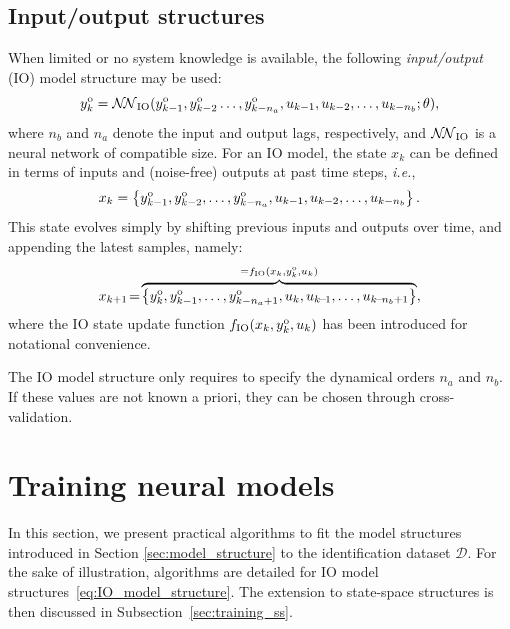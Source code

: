 \documentclass{article}
\newcommand{\NN}{\mathcal{N\!N}} %
\newcommand{\Did}{{\mathcal{D}}}
\newcommand{\ymodel}{y^{\rm o}}
\begin{document}
\subsection{Input/output structures}
When limited or no system knowledge is available, the following \emph{input/output} (IO) model structure may be used: 
\begin{equation}
\label{eq:IO_model_structure}
 \ymodel_{k} = \NN_{\rm IO}(\ymodel_{k-1}, \ymodel_{k-2}\dots, \ymodel_{k-n_a},
 u_{k-1},  u_{k-2}, \dots, u_{k-n_b}; \theta), 
\end{equation}
where $n_b$ and $n_a$ denote the input and output lags, respectively, and $\NN_{\rm IO}$ is a neural network of compatible size. For an IO model, the state $x_k$ can be defined in terms  of inputs and (noise-free) outputs at past time steps, \emph{i.e.}, 
\begin{equation}
\label{eq:IO_regressor_formula}
x_k = \left\{\ymodel_{k-1},  \ymodel_{k-2}, \dots, \ymodel_{k-n_a}, u_{k-1}, u_{k-2}, \dots, u_{k-n_b} \right\}.
\end{equation}
This state evolves simply by shifting previous inputs and outputs over time, and appending the latest samples, namely: 
\begin{equation}
\begin{split}
x_{k+1}\!=\!\overbrace{\left\{\ymodel_{k}, \ymodel_{k-1}, \dots, \ymodel_{k-n_a+1}, u_{k}, u_{k\!-\!1}, \dots, u_{k\!-\!n_b+1}\right\}}^{=f_{\rm IO}(x_k,\ymodel_k,u_k)},
\end{split}
\end{equation}
where the IO state update function $f_{\rm IO}(x_k,\ymodel_k,u_k)$ has been introduced for notational convenience.

The IO model structure only requires to specify the dynamical orders $n_a$ and $n_b$. If these values are not known a priori, they can be chosen through cross-validation.

\section{Training neural models}
\label{sec:training}

In this section, we present practical algorithms to fit the model structures  introduced in Section \ref{sec:model_structure} to the identification dataset $\Did$. 
For the sake of illustration, algorithms are detailed for  IO model structures~\eqref{eq:IO_model_structure}. 
The extension to state-space structures is then discussed in Subsection~\ref{sec:training_ss}. %
\end{document}
